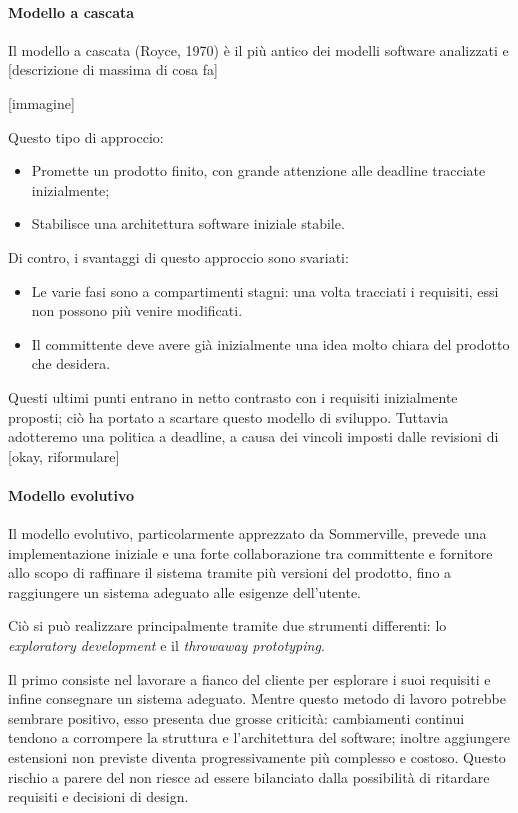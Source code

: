 			\paragraph{Modello a cascata}

			Il modello a cascata (Royce, 1970) è il più antico dei modelli software analizzati e [descrizione di massima di cosa fa]

			[immagine]

			Questo tipo di approccio:
\begin{itemize}
\item Promette un prodotto finito, con grande attenzione alle deadline tracciate inizialmente;
\item Stabilisce una architettura software iniziale stabile.
\end{itemize}

			Di contro, i svantaggi di questo approccio sono svariati:
\begin{itemize}
\item Le varie fasi sono a compartimenti stagni: una volta tracciati i requisiti, essi non possono più venire modificati.
\item Il committente deve avere già inizialmente una idea molto chiara del prodotto che desidera. 
\end{itemize}

Questi ultimi punti entrano in netto contrasto con i requisiti inizialmente proposti; ciò ha portato a scartare questo modello di sviluppo. Tuttavia adotteremo una politica a deadline, a causa dei vincoli imposti dalle revisioni di {\TV} [okay, riformulare]

			\paragraph{Modello evolutivo}

			Il modello evolutivo, particolarmente apprezzato da Sommerville, prevede una implementazione iniziale e una forte collaborazione tra committente e fornitore allo scopo di raffinare il sistema tramite più versioni del prodotto, fino a raggiungere un sistema adeguato alle esigenze dell'utente.

Ciò si può realizzare principalmente tramite due strumenti differenti: lo \textit{exploratory development} e il \textit{throwaway prototyping}.

Il primo consiste nel lavorare a fianco del cliente per esplorare i suoi requisiti e infine consegnare un sistema adeguato. Mentre questo metodo di lavoro potrebbe sembrare positivo, esso presenta due grosse criticità: cambiamenti continui tendono a corrompere la struttura e l'architettura del software; inoltre aggiungere estensioni non previste diventa progressivamente più complesso e costoso. Questo rischio a parere del  non riesce ad essere bilanciato dalla possibilità di ritardare requisiti e decisioni di design.

